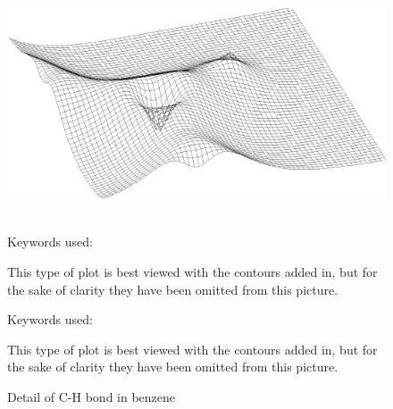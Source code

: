 \begin{figure}
\begin{makeimage}
\end{makeimage}
\begin{center}
\includegraphics{benzene} \\~\\
\begin{latexonly}
\parbox{30em}{Keywords used:


This type of plot is best viewed with the contours added in, but for the
sake of clarity they have been omitted from this picture.}
\end{latexonly}
\begin{htmlonly}
Keywords used:


This type of plot is best viewed with the contours added in, but for the
sake of clarity they have been omitted from this picture.
\end{htmlonly}
\end{center}
\caption{Detail of C-H bond in benzene}
\end{figure}

